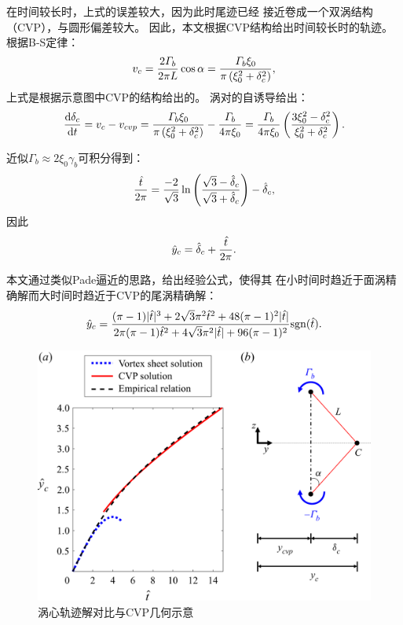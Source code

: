 \documentclass[UTF8,zihao=5]{ctexart} %
\begin{document}
在时间较长时，上式的误差较大，因为此时尾迹已经
接近卷成一个双涡结构（CVP），与圆形偏差较大。
因此，本文根据CVP结构给出时间较长时的轨迹。
根据B-S定律：
\begin{equation} v_c=\frac{2\varGamma_b}{2{\rm \pi} L}\cos\alpha=\frac{\varGamma_b \xi_0}{{\rm \pi} \left(\xi_0^{2}+\delta_c^{2}\right)}, \end{equation}
上式是根据示意图中CVP的结构给出的。
涡对的自诱导给出：
\begin{equation} \frac{\textrm{d}\delta_c}{\textrm{d}t}=v_c-v_{cvp}= \frac{\varGamma_b \xi_0}{{\rm \pi} \left(\xi_0^{2}+\delta_c^{2}\right)}- \frac{\varGamma_b}{4{\rm \pi}\xi_0}=\frac{\varGamma_b}{4{\rm \pi} \xi_0} \left(\frac{3\xi_0^{2}-\delta_c^{2}}{\xi_0^{2}+\delta_c^{2}}\right). \end{equation}

近似$\varGamma _b \approx 2\xi _0\gamma _b$可积分得到：
\begin{equation} \frac{\hat{t}}{2{\rm \pi}}=\frac{-2}{\sqrt{3}}\ln{\left(\frac{\sqrt{3}-\hat{\delta}_c}{\sqrt{3}+ \hat{\delta}_c}\right)}-\hat{\delta}_c, \end{equation}
因此
\begin{equation} \hat{y}_c=\hat{\delta}_c +\frac{\hat{t}}{2{\rm \pi}}. \end{equation}

本文通过类似Pade逼近的思路，给出经验公式，使得其
在小时间时趋近于面涡精确解而大时间时趋近于CVP的尾涡精确解：
\begin{equation} \label{eq:emp}\hat{y}_c=\frac{({\rm \pi}-1)|\hat{t}|^{3}+2\sqrt{3}{\rm \pi}^{2}\hat{t}^{2}+48({\rm \pi}-1)^{2} |\hat{t}|}{2{\rm \pi}({\rm \pi}-1)\hat{t}^{2}+4\sqrt{3}{\rm \pi}^{2}|\hat{t}|+96({\rm \pi}-1)^{2}}\textrm{sgn}(\hat{t}). \end{equation}


\begin{figure}[H]
    \centering
    \includegraphics[width=12cm]{Fig4.png}  %
    \caption{涡心轨迹解对比与CVP几何示意}
\end{figure}
\end{document}
